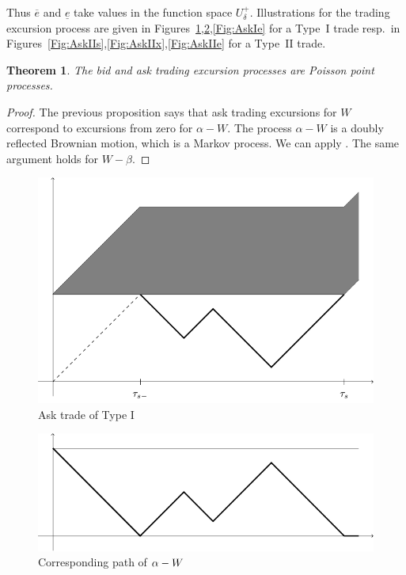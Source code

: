 \documentclass[11pt]{scrartcl}
\newtheorem{theorem}{Theorem}
\begin{document}
Thus $\overline{e}$ and $\underline{e}$ take values in the function space $U_\delta^+$. Illustrations for the trading excursion process are given in
Figures~\ref{Fig:AskIs},\ref{Fig:AskIx},\ref{Fig:AskIe} for a Type~{I} trade
resp.\ in Figures~\ref{Fig:AskIIs},\ref{Fig:AskIIx},\ref{Fig:AskIIe} for a
Type~{II} trade.

\begin{theorem}
The bid and ask trading excursion processes are Poisson point processes.
\end{theorem}

\begin{proof}
The previous proposition says that ask trading excursions for $W$ correspond to excursions from zero for $\alpha-W$. The process $\alpha-W$ is a doubly reflected Brownian motion, which is a Markov process.
We can apply \cite[Thm.3.18, p.95]{Blu}. The same argument holds for $W-\beta$.
\end{proof}
\begin{figure}[H]
\includegraphics{AskIs.pdf}
\caption{Ask trade of Type I}
\label{Fig:AskIs}
\end{figure}
\begin{figure}[H]
\includegraphics{AskIx.pdf}
\caption{Corresponding path of $\protect\alpha-W$}
\label{Fig:AskIx}
\end{figure}
\end{document}
